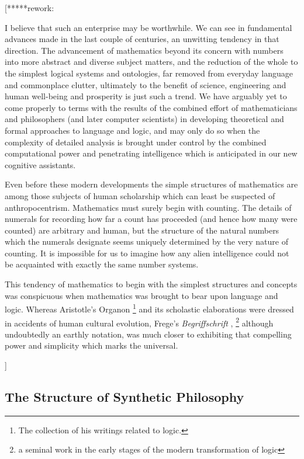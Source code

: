 \documentclass[10pt,titlepage]{book}
\begin{document}
[*****rework:{\it

I believe that such an enterprise may be worthwhile.
We can see in fundamental advances made in the last couple of centuries, an unwitting tendency in that direction.
The advancement of mathematics beyond its concern with numbers into more abstract and diverse subject matters, and the reduction of the whole to the simplest logical systems and ontologies, far removed from everyday language and commonplace clutter, ultimately to the benefit of science, engineering and human well-being and prosperity is just such a trend.
We have arguably yet to come properly to terms with the results of the combined effort of mathematicians and philosophers (and later computer scientists) in developing theoretical and formal approaches to language and logic, and may only do so when the complexity of detailed analysis is brought under control by the combined computational power and penetrating intelligence which is anticipated in our new cognitive assistants.

Even before these modern developments the simple structures of mathematics are among those subjects of human scholarship which can least be suspected of anthropocentrism.
Mathematics must surely begin with counting.
The details of numerals for recording how far a count has proceeded (and hence how many were counted) are arbitrary and human, but the structure of the natural numbers which the numerals designate seems uniquely determined by the very nature of counting.
It is impossible for us to imagine how any alien intelligence could not be acquainted with exactly the same number systems.

This tendency of mathematics to begin with the simplest structures and concepts was conspicuous when mathematics was brought to bear upon language and logic.
Whereas Aristotle's Organon%
\footnote{The collection of his writings related to logic.}%
and its scholastic elaborations were dressed in accidents of human cultural evolution, Frege's \emph{Begriffschrift} \cite{frege79}, %
\footnote{a seminal work in the early stages of the modern transformation of logic}%
  although undoubtedly an earthly notation, was much closer to exhibiting that compelling power and simplicity which marks the universal.

}]

\subsection{The Structure of Synthetic Philosophy}
\end{document}
